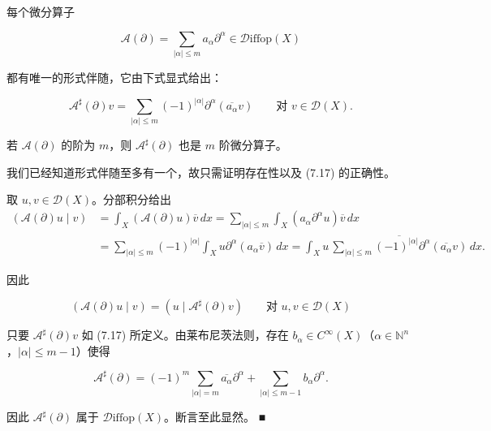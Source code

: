 \begin{proposition}

每个微分算子

\[
\mathcal{A}(\partial) = \sum_{|\alpha| \le m} a_\alpha \partial^{\alpha} \in \mathcal{D}\mathrm{iffop}(X)
\]

都有唯一的形式伴随，它由下式显式给出：

\begin{equation}
\mathcal{A}^{\sharp}(\partial)v = \sum_{|\alpha| \le m} (-1)^{|\alpha|}\partial^{\alpha}(\overline{a_\alpha}v) \qquad \text{对 } v \in \mathcal{D}(X) .\tag{7.17}
\end{equation}

若 $ \mathcal{A}(\partial) $ 的阶为 $ m $，则 $ \mathcal{A}^{\sharp}(\partial) $ 也是 $ m $ 阶微分算子。

\proofhead
我们已经知道形式伴随至多有一个，故只需证明存在性以及 (7.17) 的正确性。

取 $ u, v \in \mathcal{D}(X) $。分部积分给出
\begin{equation*}
\begin{aligned}
(\mathcal{A}(\partial)u \mid v) &= \int_X (\mathcal{A}(\partial)u)\overline{v}\, dx = \sum_{|\alpha| \le m} \int_X (a_\alpha \partial^{\alpha} u)\overline{v}\, dx \\ &= \sum_{|\alpha| \le m} (-1)^{|\alpha|} \int_X u\partial^{\alpha}(a_\alpha \overline{v})\, dx = \int_X u\,\overline{\sum_{|\alpha| \le m} (-1)^{|\alpha|}\partial^{\alpha}(\overline{a_\alpha}v)}\, dx .
\end{aligned}
\end{equation*}

因此

\[
(\mathcal{A}(\partial)u \mid v) = (u \mid \mathcal{A}^{\sharp}(\partial)v) \qquad \text{对 } u, v \in \mathcal{D}(X)
\]

只要 $ \mathcal{A}^{\sharp}(\partial)v $ 如 (7.17) 所定义。由莱布尼茨法则，存在 $ b_\alpha \in C^\infty(X) $（$ \alpha \in \mathbb{N}^n $，$ |\alpha| \le m-1 $）使得

\[
\mathcal{A}^{\sharp}(\partial) = (-1)^m \sum_{|\alpha| = m} \overline{a_\alpha}\partial^{\alpha} + \sum_{|\alpha| \le m-1} b_\alpha \partial^{\alpha} .
\]

因此 $ \mathcal{A}^{\sharp}(\partial) $ 属于 $ \mathcal{D}\mathrm{iffop}(X) $。断言至此显然。 \nobreak\hspace{0.35em}■

\end{proposition}


